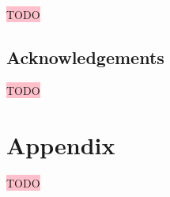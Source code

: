 \documentclass[pdflatex,sn-mathphys-num]{sn-jnl}
\begin{document}
\colorbox{pink}{TODO}


\subsection*{Acknowledgements}\label{subsec_acknowledgements}

\colorbox{pink}{TODO}


\section{Appendix}\label{sec_appendix}

\colorbox{pink}{TODO}



\end{document}
